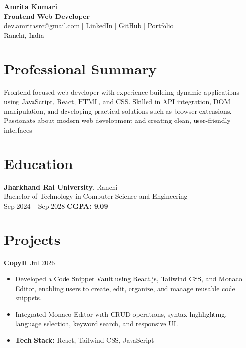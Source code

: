 \documentclass[11pt,a4paper]{article}
\begin{document}
\begin{center}
    {\LARGE \textbf{Amrita Kumari}}\\[4pt]
    \textbf{Frontend Web Developer}\\[6pt]

    \href{mailto:dev.amritasrc@gmail.com}{dev.amritasrc@gmail.com} \quad | \quad
    \href{https://linkedin.com/in/yourusername}{LinkedIn} \quad | \quad
    \href{https://github.com/amritasrc}{GitHub} \quad | \quad
    \href{https://yourportfolio.com}{Portfolio}\\
    Ranchi, India
\end{center}


\section*{Professional Summary}

Frontend-focused web developer with experience building dynamic applications using JavaScript, React, HTML, and CSS. Skilled in API integration, DOM manipulation, and developing practical solutions such as browser extensions. Passionate about modern web development and creating clean, user-friendly interfaces.


\section*{Education}

\textbf{Jharkhand Rai University}, Ranchi\\
Bachelor of Technology in Computer Science and Engineering\\
Sep 2024 -- Sep 2028 \hfill \textbf{CGPA: 9.09}


\section*{Projects}

\textbf{CopyIt} \hfill Jul 2026

\begin{itemize}[leftmargin=*]
\item Developed a Code Snippet Vault using React.js, Tailwind CSS, and Monaco Editor, enabling users to create, edit, organize, and manage reusable code snippets.
\item Integrated Monaco Editor with CRUD operations, syntax highlighting, language selection, keyword search, and responsive UI.
\item \textbf{Tech Stack:} React, Tailwind CSS, JavaScript
\end{itemize}
\end{document}

